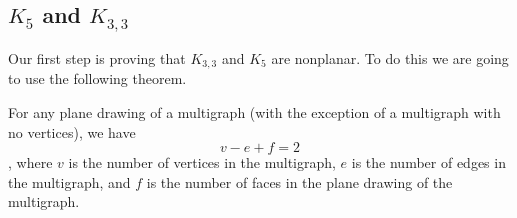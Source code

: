 \documentclass{article}
\begin{document}
\subsection{$K_5$ and $K_{3,3}$}
Our first step is proving that $K_{3,3}$ and $K_5$ are nonplanar. To do this we are going to use the following theorem.

\begin{theorem}
	For any plane drawing of a multigraph (with the exception of a multigraph with no vertices), we have $$v-e+f=2$$, where $v$ is the number of vertices in the multigraph, $e$ is the number of edges in the multigraph, and $f$ is the number of faces in the plane drawing of the multigraph.
\end{theorem}

\end{document}
